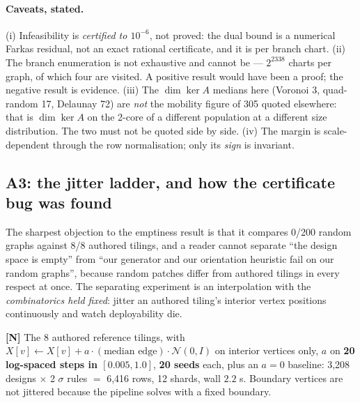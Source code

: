 \documentclass[11pt,a4paper]{article}
\theoremstyle{definition}
\begin{document}
\paragraph{Caveats, stated.} (i) Infeasibility is \emph{certified to $10^{-6}$}, not proved:
the dual bound is a numerical Farkas residual, not an exact rational certificate, and it is
per branch chart. (ii) The branch enumeration is not exhaustive and cannot be --- $2^{2338}$
charts per graph, of which four are visited. A positive result would have been a proof; the
negative result is evidence. (iii) The $\dim\ker A$ medians here (Voronoi 3, quad-random 17,
Delaunay 72) are \emph{not} the mobility figure of 305 quoted elsewhere: that is $\dim\ker A$
on the 2-core of a different population at a different size distribution. The two must not be
quoted side by side. (iv) The margin is scale-dependent through the row normalisation; only
its \emph{sign} is invariant.

\subsection{A3: the jitter ladder, and how the certificate bug was found}

The sharpest objection to the emptiness result is that it compares 0/200 random graphs against
8/8 authored tilings, and a reader cannot separate ``the design space is empty'' from ``our
generator and our orientation heuristic fail on our random graphs'', because random patches
differ from authored tilings in every respect at once. The separating experiment is an
interpolation with the \emph{combinatorics held fixed}: jitter an authored tiling's interior
vertex positions continuously and watch deployability die.

\textbf{[N]} The 8 authored reference tilings, with
$X[v]\leftarrow X[v]+a\cdot(\text{median edge})\cdot\mathcal{N}(0,I)$ on interior vertices
only, $a$ on \textbf{20 log-spaced steps in $[0.005,1.0]$}, \textbf{20 seeds} each, plus an
$a=0$ baseline: 3{,}208 designs $\times$ 2 $\sigma$ rules $=$ 6{,}416 rows, 12 shards, wall
$2.2$ s. Boundary vertices are not jittered because the pipeline solves with a fixed boundary.
\end{document}
